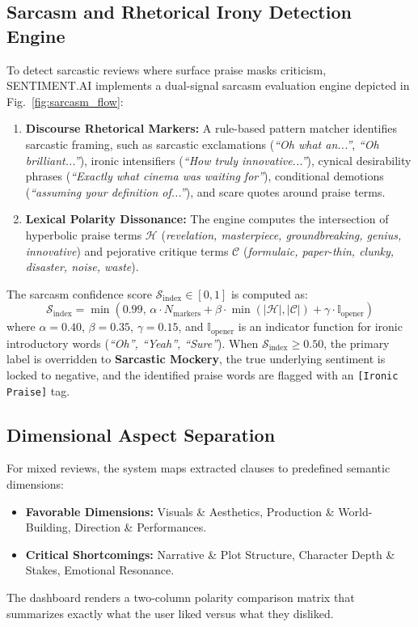\documentclass[conference]{IEEEtran}
\begin{document}
\subsection{Sarcasm and Rhetorical Irony Detection Engine}
To detect sarcastic reviews where surface praise masks criticism, SENTIMENT.AI implements a dual-signal sarcasm evaluation engine depicted in Fig.~\ref{fig:sarcasm_flow}:
\begin{enumerate}
    \item \textbf{Discourse Rhetorical Markers:} A rule-based pattern matcher identifies sarcastic framing, such as sarcastic exclamations (\textit{``Oh what an...''}, \textit{``Oh brilliant...''}), ironic intensifiers (\textit{``How truly innovative...''}), cynical desirability phrases (\textit{``Exactly what cinema was waiting for''}), conditional demotions (\textit{``assuming your definition of...''}), and scare quotes around praise terms.
    \item \textbf{Lexical Polarity Dissonance:} The engine computes the intersection of hyperbolic praise terms $\mathcal{H}$ (\textit{revelation, masterpiece, groundbreaking, genius, innovative}) and pejorative critique terms $\mathcal{C}$ (\textit{formulaic, paper-thin, clunky, disaster, noise, waste}).
\end{enumerate}

The sarcasm confidence score $\mathcal{S}_{\text{index}} \in [0, 1]$ is computed as:
\begin{equation}
\mathcal{S}_{\text{index}} = \min\left(0.99, \, \alpha \cdot N_{\text{markers}} + \beta \cdot \min(|\mathcal{H}|, |\mathcal{C}|) + \gamma \cdot \mathbb{I}_{\text{opener}}\right)
\label{eq:sarcasm}
\end{equation}
where $\alpha=0.40$, $\beta=0.35$, $\gamma=0.15$, and $\mathbb{I}_{\text{opener}}$ is an indicator function for ironic introductory words (\textit{``Oh'', ``Yeah'', ``Sure''}). When $\mathcal{S}_{\text{index}} \ge 0.50$, the primary label is overridden to \textbf{Sarcastic Mockery}, the true underlying sentiment is locked to negative, and the identified praise words are flagged with an \texttt{[Ironic Praise]} tag.

\subsection{Dimensional Aspect Separation}
For mixed reviews, the system maps extracted clauses to predefined semantic dimensions:
\begin{itemize}
    \item \textbf{Favorable Dimensions:} Visuals \& Aesthetics, Production \& World-Building, Direction \& Performances.
    \item \textbf{Critical Shortcomings:} Narrative \& Plot Structure, Character Depth \& Stakes, Emotional Resonance.
\end{itemize}
The dashboard renders a two-column polarity comparison matrix that summarizes exactly what the user liked versus what they disliked.
\end{document}
